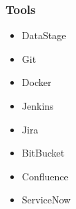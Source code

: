 \documentclass[letterpaper]{article}
\begin{document}
\begin{fullwidth}[width=\linewidth+2cm]
\begin{minipage}[t]{0.25\linewidth}
\begin{tcolorbox}[breakable, capture=minipage, title=Skills]
    \subsubsection*{Tools}
    \begin{itemize} \item DataStage \item Git \item Docker \item Jenkins \item Jira \item BitBucket %
    \item Confluence \item ServiceNow \end{itemize} %
  \end{tcolorbox}
\end{minipage}


\end{fullwidth}
\end{document}
